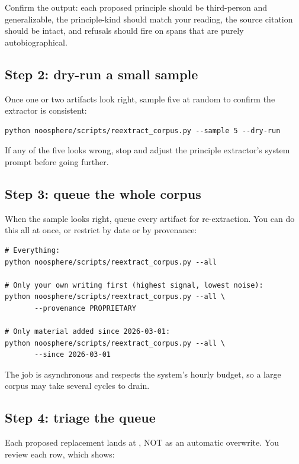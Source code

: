 \documentclass[11pt]{article}
\begin{document}
Confirm the output: each proposed principle should be third-person
and generalizable, the principle-kind should match your reading,
the source citation should be intact, and refusals should fire on
spans that are purely autobiographical.

\subsection{Step 2: dry-run a small sample}

Once one or two artifacts look right, sample five at random to
confirm the extractor is consistent:

\begin{verbatim}
python noosphere/scripts/reextract_corpus.py --sample 5 --dry-run
\end{verbatim}

If any of the five looks wrong, stop and adjust the principle
extractor's system prompt before going further.

\subsection{Step 3: queue the whole corpus}

When the sample looks right, queue every artifact for re-extraction.
You can do this all at once, or restrict by date or by provenance:

\begin{verbatim}
# Everything:
python noosphere/scripts/reextract_corpus.py --all

# Only your own writing first (highest signal, lowest noise):
python noosphere/scripts/reextract_corpus.py --all \
       --provenance PROPRIETARY

# Only material added since 2026-03-01:
python noosphere/scripts/reextract_corpus.py --all \
       --since 2026-03-01
\end{verbatim}

The job is asynchronous and respects the system's hourly budget,
so a large corpus may take several cycles to drain.

\subsection{Step 4: triage the queue}

Each proposed replacement lands at
, NOT as an automatic
overwrite. You review each row, which shows:
\end{document}
